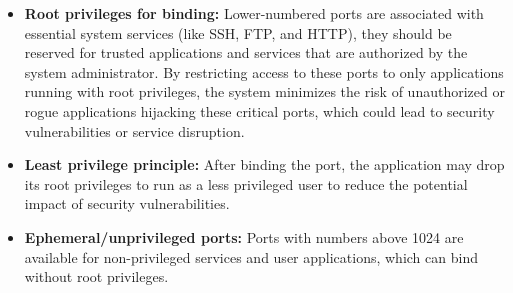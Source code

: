 \vspace{-0.25em}
\begin{itemize}
    \item \textbf{Root privileges for binding:} Lower-numbered ports are associated with essential system services (like SSH, FTP, and HTTP), they should be reserved for trusted applications and services that are authorized by the system administrator. By restricting access to these ports to only applications running with root privileges, the system minimizes the risk of unauthorized or rogue applications hijacking these critical ports, which could lead to security vulnerabilities or service disruption.
    
    \item \textbf{Least privilege principle:} After binding the port, the application may drop its root privileges to run as a less privileged user to reduce the potential impact of security vulnerabilities.
    
    \item \textbf{Ephemeral/unprivileged ports:} Ports with numbers above 1024 are available for non-privileged services and user applications, which can bind without root privileges.
\end{itemize}

